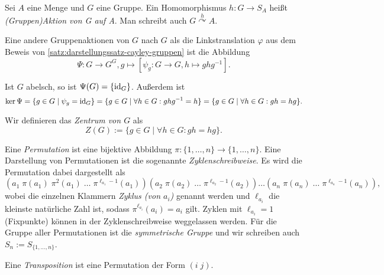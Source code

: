 \begin{definition}
    Sei $A$ eine Menge und $G$ eine Gruppe. Ein Homomorphismus $h: G \to S_A$ heißt \emph{(Gruppen)Aktion von G auf A}. Man schreibt auch $G \overset{h}{\curvearrowright} A$.
\end{definition}

\begin{remark}
   Eine andere Gruppenaktionen von $G$ nach $G$ als die Linkstranslation $\varphi$ aus dem Beweis von \cref{satz:darstellungssatz-cayley-gruppen} ist die Abbildung
   \begin{equation*}
        \Psi: G \to G^G, g \mapsto [\psi_g: G \to G, h \mapsto ghg^{-1}]. \tag*{(Konjugation)}
   \end{equation*}

   Ist $G$ abelsch, so ist $\Psi(G) = \{\operatorname{id}_G\}$. Außerdem ist 
   $$ \ker \Psi = \{g \in G \mid \psi_g = \operatorname{id}_G\} = \{g \in G \mid \forall h \in G: ghg^{-1} = h\} = \{g \in G \mid \forall h \in G: gh = hg\}. $$

   Wir definieren das \emph{Zentrum von $G$} als
   $$ Z(G) := \{ g \in G \mid \forall h \in G: gh = hg\}. $$ 
\end{remark}

\begin{definition}
    Eine \emph{Permutation} ist eine bijektive Abbildung $\pi: \{1, \ldots, n\} \to \{1, \ldots, n\}$. Eine Darstellung von Permutationen ist die sogenannte \emph{Zyklenschreibweise}. Es wird die Permutation dabei dargestellt als
    $$ (a_1\; \pi(a_1)\; \pi^2(a_1)\; \ldots \; \pi^{\ell_{a_1} - 1}(a_1)) (a_2\; \pi(a_2)\; \ldots \; \pi^{\ell_{a_2} - 1}(a_2)) \ldots (a_n\; \pi(a_n)\; \ldots \; \pi^{\ell_{a_n} - 1}(a_n)),$$
    wobei die einzelnen Klammern \emph{Zyklus (von $a_i$)} genannt werden und $\ell_{a_i}$ die kleinste natürliche Zahl ist, sodass $\pi^{\ell_{a_i}}(a_i) = a_i$ gilt. Zyklen mit $\ell_{a_i} = 1$ (Fixpunkte) können in der Zyklenschreibweise weggelassen werden.
    Für die Gruppe aller Permutationen ist die \emph{symmetrische Gruppe} und wir schreiben auch $S_n := S_{\{1,\ldots, n\}}$.


    Eine \emph{Transposition} ist eine Permutation der Form $(i\; j)$.
\end{definition}

